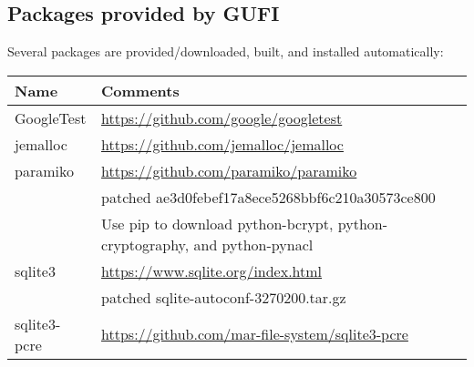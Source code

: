 \subsection{Packages provided by GUFI}
Several packages are provided/downloaded, built, and installed
automatically:
\begin{tabularx}{\textwidth}{| l | X |}
  \hline
  Name & Comments \\
  \hline
  GoogleTest & \url{https://github.com/google/googletest} \\
  \hline
  jemalloc & \url{https://github.com/jemalloc/jemalloc} \\
  \hline
  paramiko & \url{https://github.com/paramiko/paramiko} \\
  & patched ae3d0febef17a8ece5268bbf6c210a30573ce800 \\
  & Use pip to download python-bcrypt, python-cryptography, and
  python-pynacl \\
  \hline
  sqlite3 & \url{https://www.sqlite.org/index.html} \\
  & patched sqlite-autoconf-3270200.tar.gz \\
  \hline
  sqlite3-pcre & \url{https://github.com/mar-file-system/sqlite3-pcre}
  \\
  \hline
\end{tabularx}
